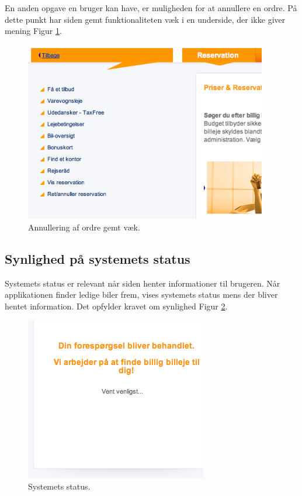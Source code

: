 \documentclass[a4paper]{article}
\begin{document}
En anden opgave en bruger kan have, er muligheden for at annullere en ordre. På
dette punkt har siden gemt funktionaliteten væk i en underside, der ikke giver
mening Figur \ref{annullering}.

\begin{figure}[]
  \begin{center}
    \includegraphics[width=400px]{3.png}
  \end{center}
  \caption{Annullering af ordre gemt væk.}
  \label{annullering}
\end{figure}

\subsection{Synlighed på systemets status}
Systemets status er relevant når siden henter informationer til brugeren. Når
applikationen finder ledige biler frem, vises systemets status mens der bliver
hentet information. Det opfylder kravet om synlighed Figur \ref{status}.

\begin{figure}[]
  \begin{center}
    \includegraphics{4.png}
  \end{center}
  \caption{Systemets status.}
  \label{status}
\end{figure}
\end{document}
